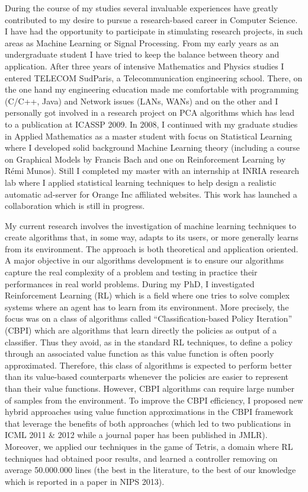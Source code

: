 During the course of my studies several invaluable experiences have greatly contributed to my desire to pursue a research-based career in Computer Science. I have had the opportunity to participate in stimulating research projects, in such areas as Machine Learning or Signal Processing.
From my early years as an undergraduate student I have tried to keep the balance between theory and application. After three years of intensive Mathematics and Physics studies I entered TELECOM SudParis, a Telecommunication engineering school. There, on the one hand my engineering education made me comfortable with programming (C/C++, Java) and Network issues (LANs, WANs) and on the other and I personally got involved in a research project on PCA algorithms which has lead to a publication at ICASSP 2009. In 2008, I continued with my graduate studies in Applied Mathematics as a master student with focus on Statistical Learning where I developed solid background Machine Learning theory (including a course on Graphical Models by Francis Bach and one on Reinforcement Learning by Rémi Munos). Still I completed my master with an internship at INRIA research lab where I applied statistical learning techniques to help design a realistic automatic ad-server for Orange Inc affiliated websites. This work has launched a collaboration which is still in progress.
 
My current research involves the investigation of machine learning techniques to create algorithms that, in some way, adapts to its users, or more generally learns from its environment. The approach is both theoretical and application oriented. A major objective in our algorithms development is to ensure our algorithms capture the real complexity of a problem and testing in practice their performances in real world problems. During my PhD, I investigated Reinforcement Learning (RL) which is a field where one tries to solve complex systems where an agent has to learn from its environment. More precisely, the focus was on a class of algorithms called ``Classification-based Policy Iteration'' (CBPI) which are algorithms that learn directly the policies as output of a classifier. Thus they avoid, as in the standard RL techniques, to define a policy through an associated value function as this value function is often poorly approximated. Therefore, this class of algorithms is expected to perform better than its value-based counterparts whenever the policies are easier to represent than their value functions. However, CBPI algorithms can require large number of samples from the environment. To improve the CBPI efficiency, I proposed new hybrid approaches using value function approximations in the CBPI framework that leverage the benefits of both approaches (which led to two publications in ICML 2011 \& 2012 while a journal paper has been published in JMLR). Moreover, we applied our techniques in the game of Tetris, a domain where RL techniques had obtained poor results, and learned a controller removing on average 50.000.000 lines (the best in the literature, to the best of our knowledge which is reported in a paper in NIPS 2013).

